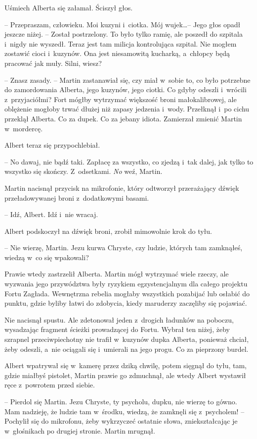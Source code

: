\documentclass[oneside,polish,11pt,sfheadings]{mwbk}
\begin{document}
Uśmiech Alberta się załamał. Ściszył głos. 

-- Przepraszam, człowieku. Moi
kuzyni i~ciotka. Mój wujek\ldots  -- Jego głos opadł jeszcze niżej. -- Został
postrzelony. To było tylko ramię, ale poszedł do szpitala i~nigdy nie
wyszedł. Teraz jest tam milicja kontrolująca szpital. Nie mogłem
zostawić cioci i~kuzynów. Ona jest niesamowitą kucharką, a~chłopcy będą
pracować jak muły. Silni, wiesz?

-- Znasz zasady. -- Martin zastanawiał się, czy miał w~sobie to, co było
potrzebne do zamordowania Alberta, jego kuzynów, jego ciotki. Co gdyby
odeszli i~wrócili z~przyjaciółmi? Fort mógłby wytrzymać większość broni
małokalibrowej, ale oblężenie mogłoby trwać dłużej niż zapasy jedzenia i~wody. Przełknął i~po cichu przeklął Alberta. Co za dupek. Co za jebany
idiota. Zamierzał zmienić Martin w~mordercę.

Albert teraz się przypochlebiał. 

-- No dawaj, nie bądź taki. Zapłacę za
wszystko, co zjedzą i~tak dalej, jak tylko to wszystko się skończy. Z~odsetkami. \textit{No} weź, Martin.

Martin nacisnął przycisk na mikrofonie, który odtworzył przerażający
dźwięk przeładowywanej broni z~dodatkowymi basami. 

-- Idź, Albert. Idź i~nie wracaj.

Albert podskoczył na dźwięk broni, zrobił mimowolnie krok do tyłu. 

-- Nie wierzę, Martin. Jezu kurwa Chryste, czy ludzie, których tam zamknąłeś,
wiedzą w~co się wpakowali?

Prawie wtedy zastrzelił Alberta. Martin mógł wytrzymać wiele rzeczy, ale
wyzwania jego przywództwa były ryzykiem egzystencjalnym dla całego
projektu Fortu Zagłada. Wewnętrzna rebelia mogłaby wszystkich pozabijać
lub osłabić do punktu, gdzie byliby łatwi do zdobycia, kiedy maruderzy
zaczęliby się pojawiać.

Nie nacisnął spustu. Ale zdetonował jeden z~drogich ładunków na poboczu,
wysadzając fragment ścieżki prowadzącej do Fortu. Wybrał ten niżej, żeby
szrapnel przeciwpiechotny nie trafił w~kuzynów dupka Alberta, ponieważ
chciał, żeby odeszli, a~nie ociągali się i~umierali na jego progu. Co za
pieprzony burdel.

Albert wpatrywał się w~kamerę przez dziką chwilę, potem sięgnął do tyłu,
tam, gdzie miałbyś pistolet, Martin prawie go zdmuchnął, ale wtedy
Albert wystawił ręce z~powrotem przed siebie.

-- Pierdol się Martin. Jezu Chryste, ty psycholu, dupku, nie wierzę to
gówno. Mam nadzieję, że ludzie tam w~środku, wiedzą, że zamknęli się z~psycholem! -- Pochylił się do mikrofonu, żeby wykrzyczeć ostatnie słowa,
zniekształcając je w~głośnikach po drugiej stronie. Martin mrugnął.
\end{document}

